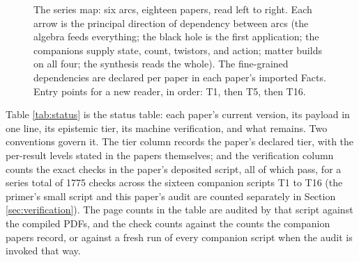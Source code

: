 \documentclass[11pt]{article}
\theoremstyle{definition}
\begin{document}
\begin{figure}[ht]
\centering
{}
\caption{The series map: six arcs, eighteen papers, read left to right. Each arrow is the principal direction of dependency between arcs (the algebra feeds everything; the black hole is the first application; the companions supply state, count, twistors, and action; matter builds on all four; the synthesis reads the whole). The fine-grained dependencies are declared per paper in each paper's imported Facts. Entry points for a new reader, in order: T1, then T5, then T16.}
\label{fig:map}
\end{figure}

Table \ref{tab:status} is the status table: each paper's current version, its payload in one line, its epistemic tier, its machine verification, and what remains. Two conventions govern it. The tier column records the paper's declared tier, with the per-result levels stated in the papers themselves; and the verification column counts the exact checks in the paper's deposited script, all of which pass, for a series total of 1775 checks across the sixteen companion scripts T1 to T16 (the primer's small script and this paper's audit are counted separately in Section \ref{sec:verification}). The page counts in the table are audited by that script against the compiled PDFs, and the check counts against the counts the companion papers record, or against a fresh run of every companion script when the audit is invoked that way.
\end{document}
